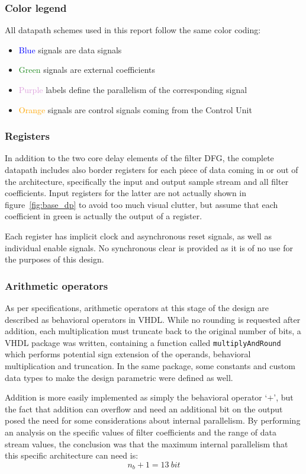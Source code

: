 \documentclass[a4paper]{article}
\begin{document}
\subsubsection{Color legend}
All datapath schemes used in this report follow the same color coding:
\begin{itemize}
    \item \textcolor{blue}{Blue} signals are data signals
    \item \textcolor{ForestGreen}{Green} signals are external coefficients
    \item \textcolor{Plum}{Purple} labels define the parallelism of the corresponding signal
    \item \textcolor{orange}{Orange} signals are control signals coming from the Control Unit
\end{itemize}

\subsubsection{Registers}
In addition to the two core delay elements of the filter DFG, the complete datapath includes also border registers for each piece of data coming in or out of the architecture, specifically the input and output sample stream and all filter coefficients. Input registers for the latter are not actually shown in figure~\ref{fig:base_dp} to avoid too much visual clutter, but assume that each coefficient in green is actually the output of a register.

Each register has implicit clock and asynchronous reset signals, as well as individual enable signals. No synchronous clear is provided as it is of no use for the purposes of this design.

\subsubsection{Arithmetic operators}
As per specifications, arithmetic operators at this stage of the design are described as behavioral operators in VHDL. While no rounding is requested after addition, each multiplication must truncate back to the original number of bits, a VHDL package was written, containing a function called \texttt{multiplyAndRound} which performs potential sign extension of the operands, behavioral multiplication and truncation. In the same package, some constants and custom data types to make the design parametric were defined as well.

Addition is more easily implemented as simply the behavioral operator `$+$', but the fact that addition can overflow and need an additional bit on the output posed the need for some considerations about internal parallelism. By performing an analysis on the specific values of filter coefficients and the range of data stream values, the conclusion was that the maximum internal parallelism that this specific architecture can need is: $$n_b+1 = \SI{13}{bit}$$
\end{document}
